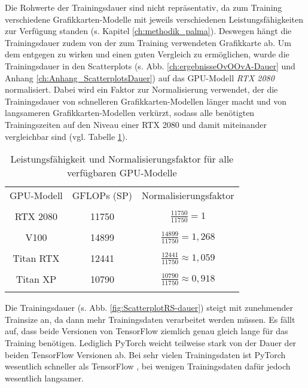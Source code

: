 Die Rohwerte der Trainingsdauer sind nicht repräsentativ, da zum Training verschiedene Grafikkarten-Modelle mit jeweils verschiedenen Leistungsfähigkeiten zur Verfügung standen (s. Kapitel \ref{ch:methodik_palma}). Deswegen hängt die Trainingsdauer zudem von der zum Training verwendeten Grafikkarte ab.
Um dem entgegen zu wirken und einen guten Vergleich zu ermöglichen, wurde die Trainingsdauer in den Scatterplots (s. Abb. \ref{ch:ergebnisseOvOOvA-Dauer} und Anhang \ref{ch:Anhang_ScatterplotsDauer}) auf das GPU-Modell \textit{RTX 2080} normalisiert. Dabei wird ein Faktor zur Normalisierung verwendet, der die Trainingsdauer von schnelleren Grafikkarten-Modellen länger macht und von langsameren Grafikkarten-Modellen verkürzt, sodass alle benötigten Trainingszeiten auf den Niveau einer RTX 2080 und damit miteinander vergleichbar sind (vgl. Tabelle \ref{tab:GPUNormalisierung}).
\begin{table}[H]
\centering
\begin{tabular}{|c|c|c|}
\hline 
GPU-Modell & GFLOPs (SP) & Normalisierungsfaktor\\
& & \\
\hline 
RTX 2080 & 11750 & $\frac{11750}{11750}=1$ \\
& & \\
\hline 
V100 & 14899 & $\frac{14899}{11750}=1,268$ \\
& & \\
\hline 
Titan RTX & 12441 & $\frac{12441}{11750} \approx 1,059$ \\
& & \\
\hline 
Titan XP & 10790 & $\frac{10790}{11750}\approx 0,918$ \\
& & \\
\hline 
\end{tabular} 
\caption{Leistungsfähigkeit und Normalisierungsfaktor für alle verfügbaren GPU-Modelle \cite{palma2GPUs}}
\label{tab:GPUNormalisierung}
\end{table}

Die Trainingsdauer (s. Abb. \ref{fig:ScatterplotRS-dauer}) steigt mit zunehmender Trainsize an, da dann mehr Trainingsdaten verarbeitet werden müssen.
Es fällt auf, dass beide Versionen von TensorFlow \cite{tensorflow} ziemlich genau gleich lange für das Training benötigen. Lediglich PyTorch \cite{pytorch} weicht teilweise stark von der Dauer der beiden TensorFlow \cite{tensorflow} Versionen ab. Bei sehr vielen Trainingsdaten ist PyTorch \cite{pytorch} wesentlich schneller als TensorFlow \cite{tensorflow}, bei wenigen Trainingsdaten dafür jedoch wesentlich langsamer.

